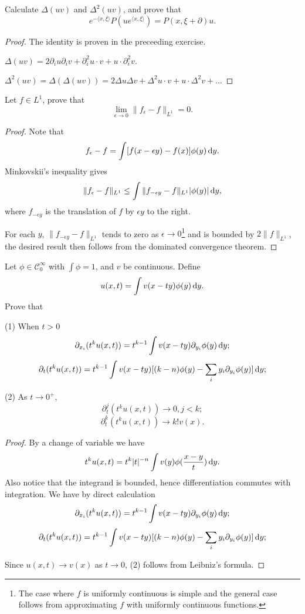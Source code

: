 \documentclass[
    ]{article}
\begin{document}
    \begin{exercise}
        Calculate $\Delta(uv)$ and $\Delta^2(uv)$, and prove that
        \[e^{-\langle x,\xi\rangle}P(ue^{\langle x,\xi\rangle})=P(x,\xi+\partial)u.\]
    \end{exercise}
    \begin{proof}
        The identity is proven in the preceeding exercise.

        $\Delta(uv)=2\partial_iu\partial_iv+\partial_i^2u\cdot v+u\cdot\partial_i^2v.$
    
        $\Delta^2(uv)=\Delta(\Delta(uv))=2\Delta u\Delta v+\Delta^2u\cdot v+u\cdot\Delta^2v+...$
    \end{proof}

    \begin{exercise}
        Let $f\in L^1$, prove that 
        \[\lim_{\epsilon\to0}\|f_\epsilon-f\|_{L^1}=0.\]
    \end{exercise}
    \begin{proof}
        Note that 
        \[f_\epsilon-f=\int[f(x-\epsilon y)-f(x)]\phi(y)\mathop{}\!\mathrm{d} y.\]
        Minkovskii's inequality gives
        \[\|f_\epsilon-f\|_{L^1}\le\int\|f_{-\epsilon y}-f\|_{L^1}|\phi(y)|\mathop{}\!\mathrm{d} y,\]
        where $f_{-\epsilon y}$ is the translation of $f$ by $\epsilon y$ to the right.

        For each $y$, $\|f_{-\epsilon y}-f\|_{L^1}$ tends to zero as $\epsilon\to0$\footnote{The case where $f$ is uniformly continuous is simple and the general case follows from approximating $f$ with uniformly continuous functions.} 
        and is bounded by $2\|f\|_{L^1}$, the desired result then follows from the dominated convergence theorem. 
    \end{proof}


    \begin{exercise}
        Let $\phi\in\mathscr C_0^\infty$ with $\int \phi=1$, and $v$ be continuous. Define 
        \[u(x,t)=\int v(x-ty)\phi(y)\mathop{}\!\mathrm{d} y.\]
        Prove that 

        (1) When $t>0$
        \[\partial_{x_i}(t^k u(x,t))=t^{k-1}\int v(x-ty)\partial_{y_i}\phi(y)\mathop{}\!\mathrm{d} y;\]
        \[\partial_t(t^ku(x,t))=t^{k-1}\int v(x-ty)[(k-n)\phi(y)-\sum_i y_i\partial_{y_i}\phi(y)]\mathop{}\!\mathrm{d} y;\]

        (2) As $t\to0^+$, 
        \[\partial_t^j(t^ku(x,t))\to 0, j<k;\]
        \[\partial_t^k(t^ku(x,t))\to k!v(x).\]
    \end{exercise}
    \begin{proof}
        By a change of variable we have 
        \[t^ku(x,t)=t^k|t|^{-n}\int v(y)\phi(\frac{x-y}t)\mathop{}\!\mathrm{d} y.\]
        Also notice that the integrand is bounded, hence differentiation commutes with integration. We have by direct calculation
        \[\partial_{x_i}(t^k u(x,t))=t^{k-1}\int v(x-ty)\partial_{y_i}\phi(y)\mathop{}\!\mathrm{d} y;\]
        \[\partial_t(t^ku(x,t))=t^{k-1}\int v(x-ty)[(k-n)\phi(y)-\sum_i y_i\partial_{y_i}\phi(y)]\mathop{}\!\mathrm{d} y;\]

        Since $u(x,t)\to v(x)$ as $t\to0$, (2) follows from Leibniz's formula.
    \end{proof}
\end{document}

